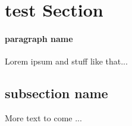 \section{test Section} %
\label{sec:test_section}

\paragraph{paragraph name} %
\label{par:paragraph_name}

Lorem ipsum and stuff like that...

\subsection{subsection name} %
\label{sub:subsection_name}

More text to come ...



